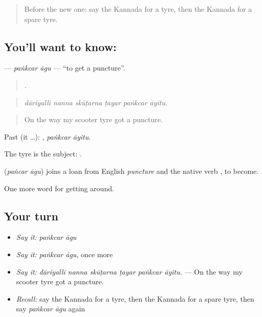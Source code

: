 \label{lesson:KA-C449-pankcar-agu}



\begin{quote}
Before the new one: say the Kannada for a tyre, then the Kannada for a spare tyre.
\end{quote}

\subsection*{You'll want to know:  }
\textbf{ } — \emph{paṅkcar āgu} — \textquotedblleft{}to get a puncture\textquotedblright{}.

\begin{quote}
     .
\end{quote}

\begin{quote}
\emph{dāriyalli nanna skūṭarna ṭayar paṅkcar āyitu.}
\end{quote}

\begin{quote}
On the way my scooter tyre got a puncture.
\end{quote}

Past (it …):  , \emph{paṅkcar āyitu}.

The tyre is the subject:   .

\begin{cousinweb}
\textbf{ } (\emph{paṅcar āgu}) joins a loan from English \emph{puncture} and the native verb , to become.
\end{cousinweb}

\begin{grammarlens}[title={What you've built}]
One more word for getting around.
\end{grammarlens}

\subsection*{Your turn}
\begin{itemize}
\raggedright
  \item \emph{Say it:} \emph{paṅkcar āgu}
  \item \emph{Say it:} \emph{paṅkcar āgu}, once more
  \item \emph{Say it:} \emph{dāriyalli nanna skūṭarna ṭayar paṅkcar āyitu.} — On the way my scooter tyre got a puncture.
  \item \emph{Recall:} say the Kannada for a tyre, then the Kannada for a spare tyre, then say \emph{paṅkcar āgu} again
\end{itemize}

